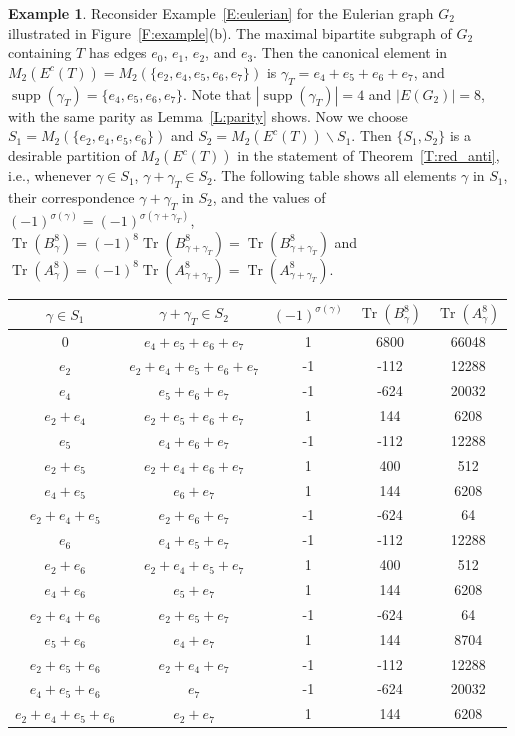 \documentclass[11pt]{amsart}
\renewcommand{\setminus}{\mathbin{\backslash}}%
\theoremstyle{plain}
\theoremstyle{definition}
\newtheorem{example}[theorem]{Example}
\DeclareMathOperator{\trace}{\operatorname{Tr}}
\DeclareMathOperator{\supp}{\operatorname{supp}}
\numberwithin{equation}{section}
\begin{document}
\begin{example} \label{E:red_anti}
Reconsider Example~\ref{E:eulerian} for the Eulerian graph $G_2$  illustrated in Figure~\ref{F:example}(b). The maximal bipartite subgraph of $G_2$ containing $T$ has edges $e_0$, $e_1$, $e_2$, and $e_3$. Then the canonical element in $M_2(E^c(T) )=M_2(\{e_2,e_4,e_5,e_6,e_7\})$ is $\gamma_T=e_4 + e_5+ e_6 +e_7$, and $\supp(\gamma_T)=\{e_4,e_5,e_6,e_7\}$. Note that $|\supp(\gamma_T)|=4$ and $|E(G_2)|=8$, with the same parity  as Lemma~\ref{L:parity} shows.  Now we choose $S_1=M_2(\{e_2,e_4,e_5,e_6\})$ and $S_2=M_2(E^c(T) )\setminus S_1$. Then $\{S_1,S_2\}$ is a desirable partition of $M_2(E^c(T) )$ in the statement of Theorem~\ref{T:red_anti}, i.e., whenever $\gamma\in S_1$, $\gamma+\gamma_T\in S_2$. The following table shows all elements $\gamma$ in  $S_1$, their correspondence $\gamma+\gamma_T$ in $S_2$, and the values of 
 $(-1)^{\sigma(\gamma)}=  (-1)^{\sigma(\gamma+\gamma_T)}$, $\trace\left(B_\gamma^8\right)=(-1)^8\trace\left(B_{\gamma+\gamma_T}^8\right)=\trace\left(B_{\gamma+\gamma_T}^8\right)$ and $\trace\left(A_\gamma^8\right)=(-1)^8\trace\left(A_{\gamma+\gamma_T}^8\right)=\trace\left(A_{\gamma+\gamma_T}^8\right)$. 

\centering
\begin{tabular}{|c|c|c|c|c|}
\hline
$\gamma\in S_1$& $\gamma+\gamma_T\in S_2$  & $(-1)^{\sigma(\gamma)}$ & $\trace\left(B_\gamma^8\right)$ & $\trace\left(A_\gamma^8\right)$  \\ \hline 
0 & $e_4 + e_5+ e_6 +e_7$ & 1 & 6800 & 66048 \\ \hline 
$e_2$ & $e_2+e_4 + e_5+ e_6 +e_7$ & -1 & -112 & 12288 \\ \hline 
$e_4$ & $e_5+ e_6 +e_7$ & -1 & -624 & 20032 \\ \hline 
$e_2+e_4$ & $e_2+e_5+ e_6 +e_7$ & 1 & 144 & 6208 \\ \hline 
$e_5$ & $e_4+ e_6 +e_7$ & -1 & -112 & 12288 \\ \hline 
$e_2+e_5$ & $e_2+e_4+ e_6 +e_7$ & 1 & 400 & 512 \\ \hline 
$e_4+e_5$ & $e_6 +e_7$ & 1 & 144 & 6208 \\ \hline 
$e_2+e_4+e_5$ & $e_2+ e_6 +e_7$ & -1 & -624 & 64 \\ \hline 
$e_6$ & $e_4+e_5 +e_7$ & -1 & -112 & 12288 \\ \hline 
$e_2+e_6$ & $e_2+e_4+ e_5 +e_7$ & 1 & 400 & 512 \\ \hline 
$e_4+e_6$ & $e_5+ e_7$ & 1 & 144 & 6208 \\ \hline 
$e_2+e_4+e_6$ & $e_2+e_5 +e_7$ & -1 & -624 & 64 \\ \hline 
$e_5+e_6$ & $e_4+ e_7$ & 1 & 144 & 8704 \\ \hline 
$e_2+e_5+e_6$ & $e_2+e_4 +e_7$ & -1 & -112 & 12288 \\ \hline 
$e_4+e_5+e_6$ & $e_7$ & -1 & -624 & 20032 \\ \hline 
$e_2+e_4+e_5+e_6$ & $e_2+ e_7$ & 1 & 144 & 6208 \\ \hline 
\end{tabular}
\end{example}
\end{document}
